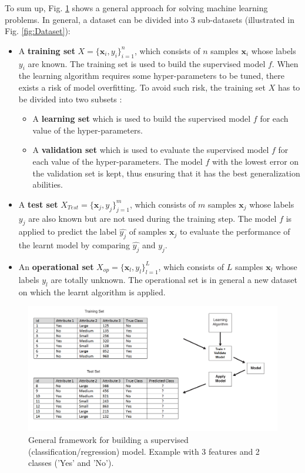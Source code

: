 \noindent To sum up, Fig. \ref{fig:LearningFramework} shows a general approach for solving machine learning problems. In general, a dataset can be divided into 3 sub-datasets (illustrated in Fig. \ref{fig:Dataset}):
\begin{itemize}
	\item A \textbf{training set} $X=\{\textbf{x}_i,y_i\}_{i=1}^n$, which consists of $n$ samples $\textbf{x}_i$ whose labels $y_i$ are known. The training set is used to build the supervised model $f$. When the learning algorithm requires some hyper-parameters to be tuned, there exists a risk of model overfitting. To avoid such risk, the training set $X$ has to be divided into two subsets :
	\begin{itemize}
		\item A \textbf{learning set} which is used to build the supervised model $f$ for each value of the hyper-parameters.
		\item A \textbf{validation set} which is used to evaluate the supervised model $f$ for each value of the hyper-parameters. The model $f$ with the lowest error on the validation set is kept, thus ensuring that it has the best generalization abilities.
	\end{itemize}
	\item A \textbf{test set} $X_{Test}=\{\textbf{x}_j,y_j\}_{j=1}^m$, which consists of $m$ samples $\textbf{x}_j$ whose labels $y_j$ are also known but are not used during the training step. The model $f$ is applied to predict the label $\hat{y_j}$ of samples $\textbf{x}_j$ to evaluate the performance of the learnt model by comparing $\hat{y_j}$ and $y_j$. 
	\item An \textbf{operational set} $X_{op}=\{\textbf{x}_l,y_l\}_{l=1}^L$, which consists of $L$ samples $\textbf{x}_l$ whose labels $y_l$ are totally unknown. The operational set is in general a new dataset on which the learnt algorithm is applied. 
\end{itemize}


\begin{figure}[h!]
	\centering
	\includegraphics[width=0.9\linewidth]{images/LearningFramework}
	\caption{General framework for building a supervised (classification/regression) model. Example with 3 features and 2 classes ('Yes' and 'No').}
	\label{fig:LearningFramework}
\end{figure}

